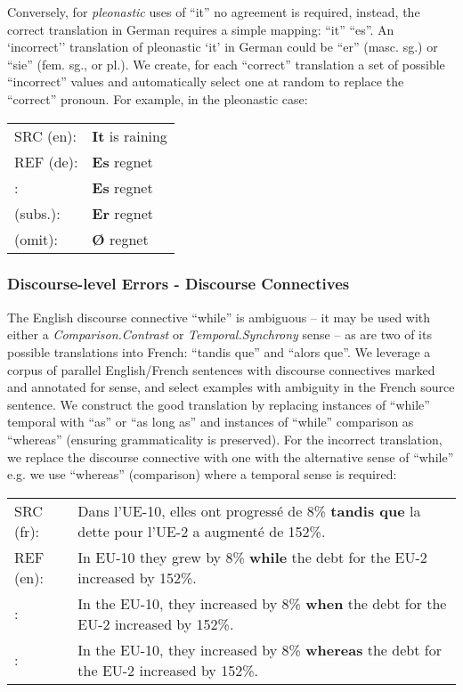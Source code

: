\documentclass[11pt]{article}
\newcommand{\cmark}{\textcolor{darkpastelgreen}{\ding{51}}}\newcommand{\xmark}{\textcolor{darkpastelred}{\ding{55}}}
\begin{document}
Conversely, for \textit{pleonastic} uses of ``it'' no agreement is required, instead, the correct translation in German requires a simple mapping: ``it''  ``es''. An `incorrect'' translation of pleonastic `it' in German could be ``er'' (masc. sg.) or ``sie'' (fem. sg., or pl.). We create, for each ``correct'' translation a set of possible ``incorrect'' values and automatically select one  at random to replace the ``correct'' pronoun. For example, in the pleonastic case:

\begin{small}
\vspace{0.5cm}
\setlength{\extrarowheight}{0.1cm}
\begin{tabular}{ll}
     SRC (en): & \textbf{It} is raining\\
     REF (de): & \textbf{Es} regnet\\
     \cmark{}: & \textbf{Es} regnet\\
     \xmark{} (subs.): & \textbf{Er} regnet\\
     \xmark{} (omit): & \textbf{\O{}} regnet
\end{tabular}
\vspace{0.35cm}
\end{small}


\subsubsection{Discourse-level Errors - Discourse Connectives}
The English discourse connective ``while'' is ambiguous -- it may be used with either a \textit{Comparison.Contrast} or \textit{Temporal.Synchrony} sense -- as are two of its possible translations into French: ``tandis que'' and ``alors que''. We leverage a corpus of parallel English/French sentences with discourse connectives marked and annotated for sense, and select examples with ambiguity in the French source sentence. We construct the good translation by replacing instances of ``while'' temporal with ``as'' or ``as long as'' and instances of ``while'' comparison as ``whereas'' (ensuring grammaticality is preserved). For the incorrect translation, we replace the discourse connective with one with the alternative sense of ``while'' e.g. we use ``whereas'' (comparison) where a temporal sense is required:

\begin{small}
\vspace{0.5cm}
\setlength{\extrarowheight}{0.1cm}
\begin{tabularx}{0.95\columnwidth}{lX}
     SRC (fr): & Dans l'UE-10, elles ont progressé de 8\% \textbf{tandis que} la dette pour l'UE-2 a augmenté de 152\%. \\
     REF (en): & In EU-10 they grew by 8\% \textbf{while} the debt for the EU-2 increased by 152\%. \\
     \cmark: & In the EU-10, they increased by 8\% \textbf{when} the debt for the EU-2 increased by 152\%. \\
     \xmark: & In the EU-10, they increased by 8\% \textbf{whereas} the debt for the EU-2 increased by 152\%. \vspace{0.35cm}
\end{tabularx}
\end{small}
\end{document}

